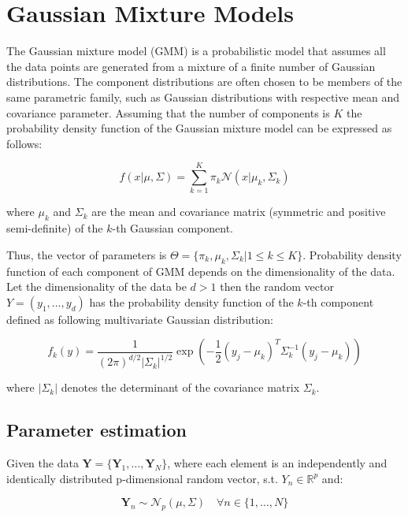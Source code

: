 \section{Gaussian Mixture Models}
The Gaussian mixture model (GMM) is a probabilistic model that assumes all the data points are generated 
from a mixture of a finite number of Gaussian distributions. The component distributions are often chosen to be members of the same parametric family,
such as Gaussian distributions with respective mean and covariance parameter. Assuming that the number of components is $K$
the probability density function of the Gaussian mixture model can be expressed as follows:

\begin{equation}
    f(x|\mu,\Sigma) = \sum_{k=1}^{K} \pi_k \mathcal{N}(x|\mu_k, \Sigma_k)
\end{equation}

where $\mu_k$ and $\Sigma_k$ are the mean and covariance matrix (symmetric and positive semi-definite) of the $k$-th Gaussian component. 

Thus, the vector of parameters is $\Theta = \{\pi_k,\mu_k,\Sigma_k|1\leq k \leq K \}$. Probability density function of each component of GMM depends on the dimensionality of the data.
Let the dimensionality of the data be $d>1$ then the random vector $Y=(y_1,\ldots,y_d)$ has the probability density function of the $k$-th component 
defined as following multivariate Gaussian distribution:

\begin{equation}
    f_k(y) = \frac{1}{(2\pi)^{d/2}|\Sigma_k|^{1/2}} \exp\left(-\frac{1}{2}(y_j-\mu_k)^T\Sigma_k^{-1}(y_j-\mu_k)\right)
\end{equation}

where $|\Sigma_k|$ denotes the determinant of the covariance matrix $\Sigma_k$.

\subsection{Parameter estimation}

Given the data $\textbf{Y} = \{\textbf{Y}_1,\ldots,\textbf{Y}_N\}$, where each element is an independently and identically distributed 
p-dimensional random vector, s.t. $Y_n \in \mathbb{R}^p$ and:

\begin{equation}
    \textbf{Y}_n \sim \mathcal{N}_p(\mu, \Sigma) \quad \forall n \in \{1,\ldots,N\} 
\end{equation}

